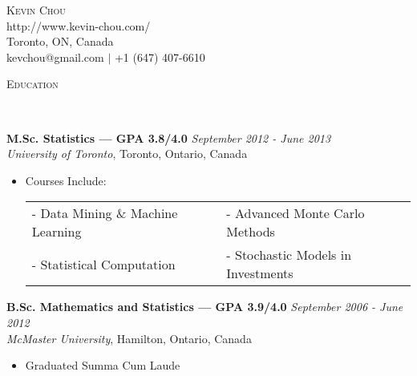 \documentclass[9pt]{article}
\newenvironment{changemargin}[2]{%
  \begin{list}{}{%
    \setlength{\topsep}{0pt}%
    \setlength{\leftmargin}{#1}%
    \setlength{\rightmargin}{#2}%
    \setlength{\listparindent}{\parindent}%
    \setlength{\itemindent}{\parindent}%
    \setlength{\parsep}{\parskip}%
  }%
  \item[]}{\end{list}
}
\newcommand{\lineover}{
  \begin{changemargin}{-0.05in}{-0.05in}
    \vspace*{-8pt}
    \hrulefill \\
    \vspace*{-2pt}
  \end{changemargin}
}
\newcommand{\header}[1]{
  \begin{changemargin}{-0.5in}{-0.5in}
    {\large \scshape{#1}}\\
    \lineover
  \end{changemargin}
}
\newcommand{\contact}[4]{
  \begin{changemargin}{-0.5in}{-0.5in}
    \begin{center}
      {\Large \scshape {#1}}\\ \smallskip
      {#2}\\ \smallskip
      {#3}\\ \smallskip
      {#4}\smallskip
    \end{center}
  \end{changemargin}
}
\newenvironment{body} {
  \vspace*{-16pt}
  \begin{changemargin}{-0.25in}{-0.5in}
  }
  {\end{changemargin}
}
\begin{document}

\contact{Kevin Chou}{http://www.kevin-chou.com/}{Toronto, ON, Canada}{kevchou@gmail.com $|$ +1 (647) 407-6610}

\header{Education}

\begin{body}
  \vspace{14pt}
  \textbf{M.Sc. Statistics --- GPA 3.8/4.0}{} \hfill \emph{September 2012 - June 2013}{} \\
  \emph{University of Toronto}, Toronto, Ontario, Canada \\
    \begin{itemize}
    \item Courses Include:\\
  \vspace{0.1cm}
  \hspace{0.1cm}
  \begin{tabular}{l l}
  \vspace{0.1cm}
        -\hspace{0.05cm} Data Mining \& Machine Learning & -\hspace{0.05cm} Advanced Monte Carlo Methods \\
        \vspace{0.1cm}
        -\hspace{0.05cm} Statistical Computation  & -\hspace{0.05cm} Stochastic Models in Investments   \\
  \end{tabular}
  \end{itemize}

  \textbf{B.Sc. Mathematics and Statistics --- GPA 3.9/4.0} \hfill \emph{September 2006 - June 2012} \\
  \emph{McMaster University}, Hamilton, Ontario, Canada\\
  \begin{itemize}
        \item Graduated Summa Cum Laude
  \end{itemize}
\end{body}
\end{document}
